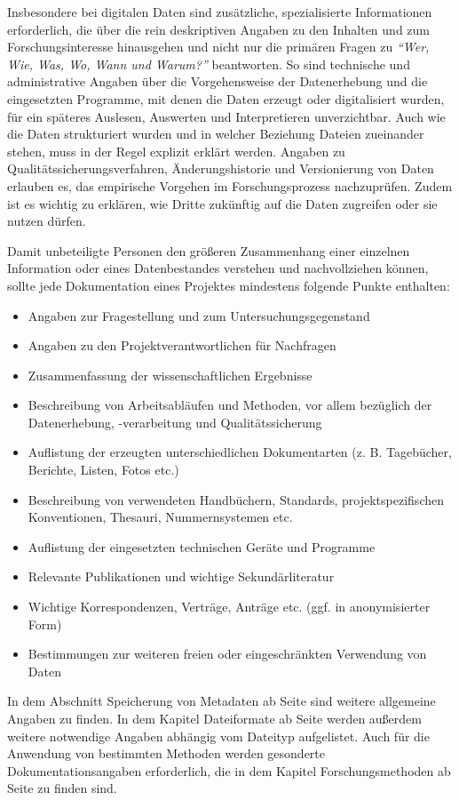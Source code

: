 Insbesondere bei digitalen Daten sind zusätzliche, spezialisierte Informationen erforderlich, die über die rein deskriptiven Angaben zu den Inhalten und zum Forschungsinteresse hinausgehen und nicht nur die primären Fragen zu \emph{"`Wer, Wie, Was, Wo, Wann und Warum?"'} beantworten. So sind technische und administrative Angaben über die Vorgehensweise der Datenerhebung und die eingesetzten Programme, mit denen die Daten erzeugt oder digitalisiert wurden, für ein späteres Auslesen, Auswerten und Interpretieren unverzichtbar. Auch wie die Daten strukturiert wurden und in welcher Beziehung Dateien zueinander stehen, muss in der Regel explizit erklärt werden. Angaben zu Qualitätssicherungsverfahren,  Änderungshistorie und Versionierung von Daten erlauben es, das empirische Vorgehen im Forschungsprozess nachzuprüfen. Zudem ist es wichtig zu erklären, wie Dritte zukünftig auf die Daten zugreifen  oder sie nutzen dürfen.

Damit unbeteiligte Personen den größeren Zusammenhang einer einzelnen Information oder eines Datenbestandes verstehen und nachvollziehen können, sollte jede Dokumentation eines Projektes mindestens folgende Punkte enthalten:
\begin{itemize}
	\item Angaben zur Fragestellung und zum Untersuchungsgegenstand
	\item Angaben zu den Projektverantwortlichen für Nachfragen
	\item Zusammenfassung der wissenschaftlichen Ergebnisse
	\item Beschreibung von Arbeitsabläufen und Methoden, vor allem bezüglich der Datenerhebung, -verarbeitung und Qualitätssicherung
	\item Auflistung der erzeugten unterschiedlichen Dokumentarten (z. B. Tagebücher, Berichte, Listen, Fotos etc.)
	\item Beschreibung von verwendeten Handbüchern, Standards, projektspezifischen Konventionen, Thesauri, Nummernsystemen etc.
	\item Auflistung der eingesetzten technischen Geräte und Programme
	\item Relevante Publikationen und wichtige Sekundärliteratur
	\item Wichtige Korrespondenzen, Verträge, Anträge etc. (ggf. in anonymisierter Form) 
	\item Bestimmungen zur weiteren freien oder eingeschränkten Verwendung von Daten
\end{itemize}

In dem Abschnitt Speicherung von Metadaten ab Seite \pageref{metadatenSpeicherung} sind weitere allgemeine Angaben zu finden. In dem Kapitel Dateiformate ab Seite \pageref{dateiformate} werden außerdem weitere notwendige Angaben abhängig vom Dateityp aufgelistet. Auch für die Anwendung von bestimmten Methoden werden gesonderte Dokumentationsangaben erforderlich, die in dem Kapitel Forschungsmethoden ab Seite \pageref{methoden} zu finden sind.



